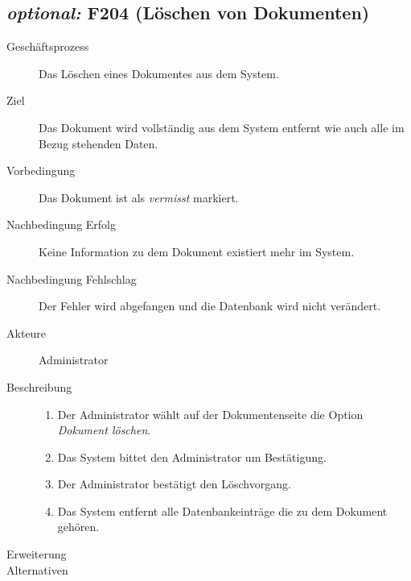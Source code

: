 \subsection{\emph{optional:} F204 (Löschen von Dokumenten)}
\label{F:Löschen}
\begin{description}
  \item[Geschäftsprozess]Das Löschen eines Dokumentes aus dem System.
  \item[Ziel]Das Dokument wird vollständig aus dem System entfernt wie auch alle im Bezug stehenden Daten.
  \item[Vorbedingung]Das Dokument ist als \emph{vermisst} markiert.
  \item[Nachbedingung Erfolg]Keine Information zu dem Dokument existiert mehr im System.
  \item[Nachbedingung Fehlschlag]Der Fehler wird abgefangen und die Datenbank wird nicht verändert.
  \item[Akteure]Administrator
  \item[Beschreibung]\hfill
    \begin{enumerate}
      \item Der Administrator wählt auf der Dokumentenseite die Option \emph{Dokument löschen}.
      \item Das System bittet den Administrator um Bestätigung.
      \item Der Administrator bestätigt den Löschvorgang.
      \item Das System entfernt alle Datenbankeinträge die zu dem Dokument gehören.
    \end{enumerate}
  \item[Erweiterung]
  \item[Alternativen]
\end{description}

